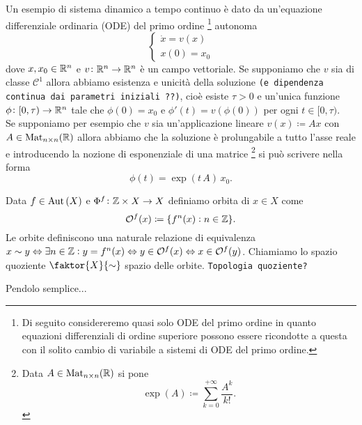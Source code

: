 Un esempio di sistema dinamico a tempo continuo è dato da un'equazione differenziale ordinaria (ODE) del primo ordine \footnote{Di seguito considereremo quasi solo ODE del primo ordine in quanto equazioni differenziali di ordine superiore possono essere ricondotte a questa con il solito cambio di variabile a sistemi di ODE del primo ordine.} autonoma
\begin{equation}
	\begin{cases}
		\dot{x} = v(x) \\
		x(0) = x_0
	\end{cases}
\end{equation} 
dove $ x, x_0 \in \mathbb{R}^n $ e $ v \colon \mathbb{R}^n \to \mathbb{R}^n $ è un campo vettoriale. Se supponiamo che $ v $ sia di classe $ \mathcal{C}^1 $ allora abbiamo esistenza e unicità della soluzione \texttt{(e dipendenza continua dai parametri iniziali ??)}, cioè esiste $ \tau > 0 $ e un'unica funzione $ \phi \colon [0, \tau) \to \mathbb{R}^n $ tale che $ \phi(0) = x_0 $ e $ \phi'(t) = v(\phi(0)) $ per ogni $ t \in [0, \tau) $. \\
Se supponiamo per esempio che $ v $ sia un'applicazione lineare $ v(x) \coloneqq A x $ con $ A \in \mathrm{Mat}_{n \times n}(\mathbb{R}) $ allora abbiamo che la soluzione è prolungabile a tutto l'asse reale e introducendo la nozione di esponenziale di una matrice %
\footnote{%
	Data $ A \in \mathrm{Mat}_{n \times n}(\mathbb{R}) $ si pone 
	\[
		\exp(A) \coloneqq \sum_{k = 0}^{+\infty} \frac{A^k}{k!}.
	\] 
} si può scrivere nella forma 
\[
	\phi(t) = \exp{\left(t \, A\right)} \, x_0. 
\]


\begin{definition}
	Data $ f \in \operatorname{Aut}{(X)} $ e $ \Phi^f \colon \mathbb{Z} \times X \to X $ definiamo orbita di $ x \in X $ come 
	\[
	\mathcal{O}^f(x) \coloneqq \{f^n(x) : n \in \mathbb{Z}\}.
	\]
	Le orbite definiscono una naturale relazione di equivalenza $ x \sim y \Leftrightarrow \exists n \in \mathbb{Z} : y = f^n(x) \Leftrightarrow y \in \mathcal{O}^f(x) \Leftrightarrow x \in \mathcal{O}^f(y) $. Chiamiamo lo spazio quoziente $ \faktor{X}{\sim} $ spazio delle orbite. \texttt{Topologia quoziente?}
\end{definition}

Pendolo semplice...
